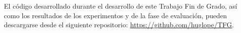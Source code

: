 El código desarrollado durante el desarrollo de este Trabajo Fin de Grado, así como los resultados de los experimentos y de la fase de evaluación, pueden descargarse desde el siguiente repositorio: \url{https://github.com/huglope/TFG}.